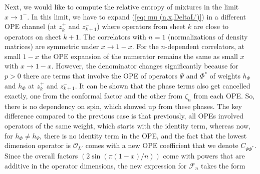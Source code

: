 \documentclass[11pt]{article}
\newcommand{\mO}{\mathcal{O}}
\newcommand{\nn}{\nonumber}
\newcommand{\lb}{\left(}
\newcommand{\rb}{\right)}
\begin{document}
Next, we would like to compute the relative entropy of mixtures in the limit $x\to 1^-$. In this limit, we have to expand (\ref{eq: mu (n,x,DeltaL')}) in a different OPE channel (at $z_k^+$ and $z_{k+1}^-$) where operators from sheet $k$ are close to operators on sheet $k+1$. The correlators with $n=1$ (normalizations of density matrices) are symmetric under $x\to 1-x$. For the $n$-dependent correlators, at small $1-x$ the OPE expansion of the numerator remains the same as small $x$ with $x\to 1-x$. However, the denominator changes significantly because for $p>0$ there are terms that involve the OPE of operators $\Psi$ and $\Phi^*$ of weights $h_\Psi$ and $h_{\Phi}$ at $z_k^+$ and $z_{k+1}^-$. It can be shown that the phase terms also get cancelled exactly, one from the conformal factor and the other from $\zeta_n$ from each OPE. So, there is no dependency on spin, which showed up from these phases. 
  The key difference compared to the previous case is that previously, all OPEs involved operators of the same weight, which starts with the identity term, whereas now, for $h_\Phi\neq h_\Psi$, there is no identity term in the OPE, and the fact that the lowest dimension operator is $\mO_{L'}$ comes with a new OPE coefficient that we denote $C_{\Psi\Phi^*}$. Since the overall factors $(2\sin(\pi (1-x)/n))$ come with powers that are additive in the operator dimensions, the new expression for $\mathcal{F}_n$  takes the form
\end{document}
